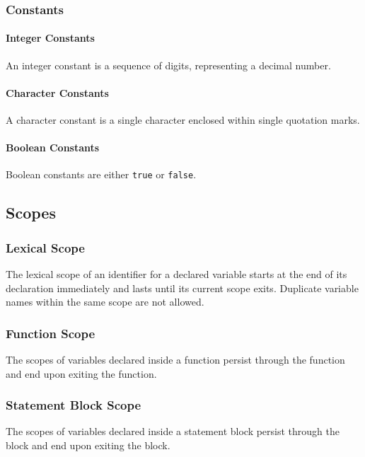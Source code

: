 \subsubsection{Constants}

\paragraph{Integer Constants}
An integer constant is a sequence of digits, representing a decimal number.

\paragraph{Character Constants}
A character constant is a single character enclosed within single quotation marks.

\paragraph{Boolean Constants}
Boolean constants are either \verb"true" or \verb"false".

\subsection{Scopes}

\subsubsection{Lexical Scope}

The lexical scope of an identifier for a declared variable starts at the end of its declaration
immediately and lasts until its current scope exits. Duplicate variable names within the same scope
are not allowed.  

\subsubsection{Function Scope}

The scopes of variables declared inside a function persist through the function and end upon exiting
the function.

\subsubsection{Statement Block Scope}

The scopes of variables declared inside a statement block persist through the block and end upon
exiting the block.

